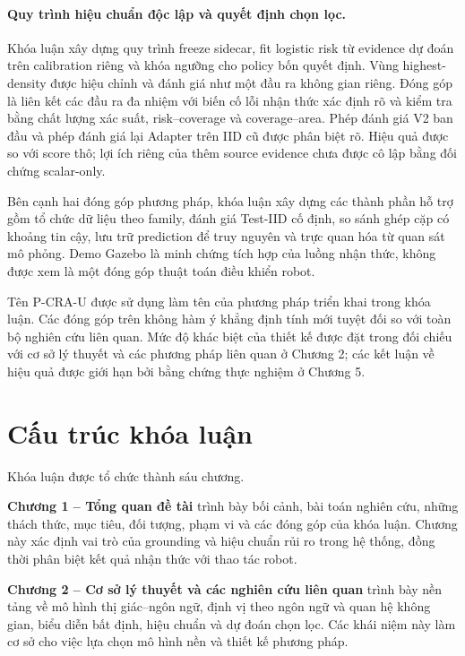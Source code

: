 \paragraph{Quy trình hiệu chuẩn độc lập và quyết định chọn lọc.}
Khóa luận xây dựng quy trình freeze sidecar, fit logistic risk từ evidence dự đoán trên calibration riêng và khóa ngưỡng cho policy bốn quyết định. Vùng highest-density được hiệu chỉnh và đánh giá như một đầu ra không gian riêng. Đóng góp là liên kết các đầu ra đa nhiệm với biến cố lỗi nhận thức xác định rõ và kiểm tra bằng chất lượng xác suất, risk--coverage và coverage--area. Phép đánh giá V2 ban đầu và phép đánh giá lại Adapter trên IID cũ được phân biệt rõ. Hiệu quả được so với score thô; lợi ích riêng của thêm source evidence chưa được cô lập bằng đối chứng scalar-only.

Bên cạnh hai đóng góp phương pháp, khóa luận xây dựng các thành phần hỗ trợ gồm tổ chức dữ liệu theo family, đánh giá Test-IID cố định, so sánh ghép cặp có khoảng tin cậy, lưu trữ prediction để truy nguyên và trực quan hóa từ quan sát mô phỏng. Demo Gazebo là minh chứng tích hợp của luồng nhận thức, không được xem là một đóng góp thuật toán điều khiển robot.

Tên P-CRA-U được sử dụng làm tên của phương pháp triển khai trong khóa luận. Các đóng góp trên không hàm ý khẳng định tính mới tuyệt đối so với toàn bộ nghiên cứu liên quan. Mức độ khác biệt của thiết kế được đặt trong đối chiếu với cơ sở lý thuyết và các phương pháp liên quan ở Chương 2; các kết luận về hiệu quả được giới hạn bởi bằng chứng thực nghiệm ở Chương 5.

\section{Cấu trúc khóa luận}
\label{sec:introduction-organization}

Khóa luận được tổ chức thành sáu chương.

\textbf{Chương 1 -- Tổng quan đề tài} trình bày bối cảnh, bài toán nghiên cứu, những thách thức, mục tiêu, đối tượng, phạm vi và các đóng góp của khóa luận. Chương này xác định vai trò của grounding và hiệu chuẩn rủi ro trong hệ thống, đồng thời phân biệt kết quả nhận thức với thao tác robot.

\textbf{Chương 2 -- Cơ sở lý thuyết và các nghiên cứu liên quan} trình bày nền tảng về mô hình thị giác--ngôn ngữ, định vị theo ngôn ngữ và quan hệ không gian, biểu diễn bất định, hiệu chuẩn và dự đoán chọn lọc. Các khái niệm này làm cơ sở cho việc lựa chọn mô hình nền và thiết kế phương pháp.

